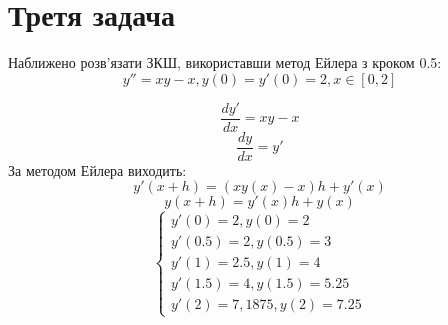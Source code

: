 \section{Третя задача}

\begin{tcolorbox}[title=Задача 3]
    \begin{center}
        Наближено розв'язати ЗКШ, використавши метод Ейлера з кроком 0.5:
        $$ y'' = xy - x, y(0)=y'(0)=2, x \in [0, 2]$$
    \end{center}
\end{tcolorbox}

$$\frac{dy'}{dx} = xy - x$$
$$\frac{dy}{dx} = y'$$
За методом Ейлера виходить:
$$y'(x+h) = (xy(x) - x)h + y'(x)$$
$$y(x+h) = y'(x)h + y(x)$$
$$
\begin{cases}
    y'(0)=2, y(0) = 2 \\
    y'(0.5)= 2, y(0.5) = 3\\
    y'(1) = 2.5, y(1) = 4\\
    y'(1.5) = 4, y(1.5) = 5.25 \\
    y'(2) = 7,1875, y(2) = 7.25
\end{cases}
$$